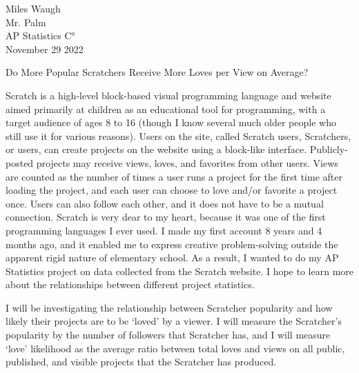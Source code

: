 \documentclass[12pt]{article}
\begin{document}
\begin{flushleft}
	
	Miles Waugh\\
	Mr. Palm\\
	AP Statistics C°\\
	November 29 2022\\
	
	
	\begin{center}
		Do More Popular Scratchers Receive More Loves per View on Average?
	\end{center}
	
	
	\setlength{\parindent}{0.5in}
	
	Scratch is a high-level block-based visual programming language and website aimed primarily at children as an educational tool for programming, with a target audience of ages 8 to 16 (though I know several much older people who still use it for various reasons). Users on the site, called Scratch users, Scratchers, or users, can create projects on the website using a block-like interface. Publicly-posted projects may receive views, loves, and favorites from other users. Views are counted as the number of times a user runs a project for the first time after loading the project, and each user can choose to love and/or favorite a project once. Users can also follow each other, and it does not have to be a mutual connection.
	Scratch is very dear to my heart, because it was one of the first programming languages I ever used. I made my first account 8 years and 4 months ago, and it enabled me to express creative problem-solving outside the apparent rigid nature of elementary school. As a result, I wanted to do my AP Statistics project on data collected from the Scratch website. I hope to learn more about the relationships between different project statistics.
	
	I will be investigating the relationship between Scratcher popularity and how likely their projects are to be ‘loved’ by a viewer. I will measure the Scratcher’s popularity by the number of followers that Scratcher has, and I will measure ‘love’ likelihood as the average ratio between total loves and views on all public, published, and visible projects that the Scratcher has produced.
	

\end{flushleft}
\end{document}
